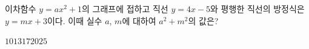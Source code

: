 이차함수 $y=ax^2+1$의 그래프에 접하고 직선 $y=4x-5$와 평행한 직선의 방정식은 $y=mx+3$이다. 이때 실수 $a$, $m$에 대하여 $a^2+m^2$의 값은?
\begin{choices32}{$10$}{$13$}{$17$}{$20$}{$25$}\end{choices32}
